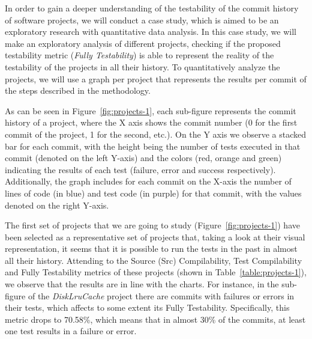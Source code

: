 In order to gain a deeper understanding of the testability of the commit history of software projects, we will conduct a case study, which is aimed to be an exploratory research with quantitative data analysis. 
In this case study, we will make an exploratory analysis of different projects, checking if the proposed testability metric (\textit{Fully Testability}) is able to represent the reality of the testability of the projects in all their history.
To quantitatively analyze the projects, we will use a graph per project that represents the results per commit of the steps described in the methodology. 

As can be seen in Figure~\ref{fig:projects-1}, each sub-figure represents the commit history of a project, where the X axis shows the commit number (0 for the first commit of the project, 1 for the second, etc.). On the Y axis we observe a stacked bar for each commit, with the height being the number of tests executed in that commit (denoted on the left Y-axis) and the colors (red, orange and green) indicating the results of each test (failure, error and success respectively). Additionally, the graph includes for each commit on the X-axis the number of lines of code (in blue) and test code (in purple) for that commit, with the values denoted on the right Y-axis.


The first set of projects that we are going to study (Figure~\ref{fig:projects-1}) have been selected as a representative set of projects that, taking a look at their visual representation, it seems that it is possible to run the tests in the past in almost all their history.
Attending to the Source (Src) Compilability, Test Compilability and Fully Testability metrics of these projects (shown in Table~\ref{table:projects-1}), we observe that the results are in line with the charts.
For instance, in the sub-figure of the \textit{DiskLruCache} project there are commits with failures or errors in their tests, which affects to some extent its Fully Testability. 
Specifically, this metric drops to 70.58\%, which means that in almost 30\% of the commits, at least one test results in a failure or error.


